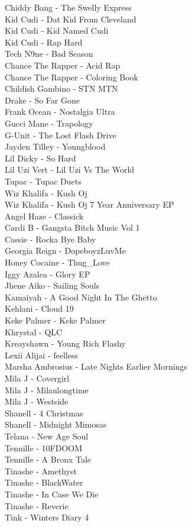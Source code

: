 Chiddy Bang - The Swelly Express\\
Kid Cudi - Dat Kid From Cleveland\\
Kid Cudi - Kid Named Cudi\\
Kid Cudi - Rap Hard\\
Tech N9ne - Bad Season\\
Chance The Rapper - Acid Rap\\
Chance The Rapper - Coloring Book\\
Childish Gambino - STN MTN\\
Drake - So Far Gone\\
Frank Ocean - Nostalgia Ultra\\
Gucci Mane - Trapology\\
G-Unit - The Lost Flash Drive\\
Jayden Tilley - Youngblood\\
Lil Dicky - So Hard\\
Lil Uzi Vert - Lil Uzi Vs The World\\
Tupac - Tupac Duets\\
Wiz Khalifa - Kush Oj\\
Wiz Khalifa - Kush Oj 7 Year Anniversary EP\\
Angel Haze - Classick\\
Cardi B - Gangsta Bitch Music Vol 1\\
Cassie - Rocka Bye Baby\\
Georgia Reign - DopeboyzLuvMe\\
Honey Cocaine - Thug\_Love\\
Iggy Azalea - Glory EP\\
Jhene Aiko - Sailing Souls\\
Kamaiyah - A Good Night In The Ghetto\\
Kehlani - Cloud 19\\
Keke Palmer - Keke Palmer\\
Khrystal - QLC\\
Kreayshawn - Young Rich Flashy\\
Lexii Alijai - feelless\\
Marsha Ambrosius - Late Nights Earlier Mornings\\
Mila J - Covergirl\\
Mila J - Milaulongtime\\
Mila J - Westside\\
Shanell - 4 Christmas\\
Shanell - Midnight Mimosas\\
Telana - New Age Soul\\
Tennille - 10FDOOM\\
Tennille - A Bronx Tale\\
Tinashe - Amethyst\\
Tinashe - BlackWater\\
Tinashe - In Case We Die\\
Tinashe - Reverie\\
Tink - Winters Diary 4\\

